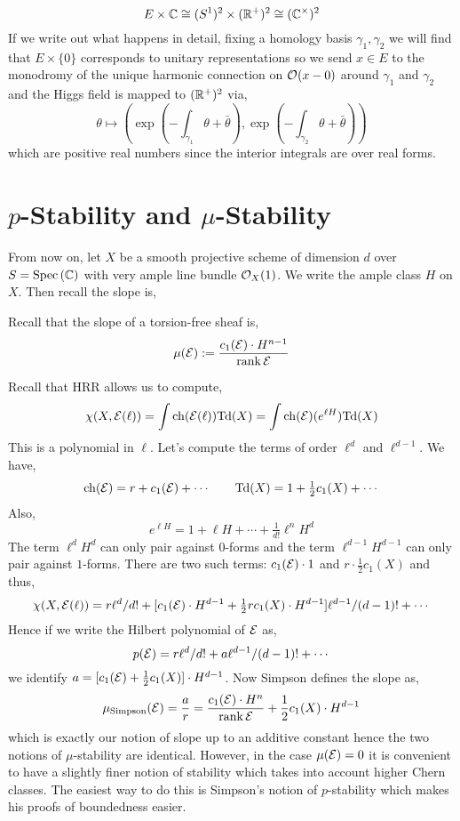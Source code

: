 \documentclass[12pt]{article}
\begin{document}
\[ E \times \mathbb{C} \cong (S^1)^2 \times (\mathbb{R}^+)^2 \cong (\mathbb{C}^\times)^2 \]
If we write out what happens in detail, fixing a homology basis $\gamma_1, \gamma_2$ we will find that $E \times \{ 0 \}$ corresponds to unitary representations so we send $x \in E$ to the monodromy of the unique harmonic connection on $\mathcal{O}_{}(x - 0)$ around $\gamma_1$ and $\gamma_2$ and the Higgs field is mapped to $(\mathbb{R}^+)^2$ via,
\[ \theta \mapsto \left( \exp\left( - \int_{\gamma_1} \theta + \bar{\theta} \right), \exp\left( - \int_{\gamma_2} \theta + \bar{\theta} \right) \right) \] 
which are positive real numbers since the interior integrals are over real forms.

\section{$p$-Stability and $\mu$-Stability}

From now on, let $X$ be a smooth projective scheme of dimension $d$ over $S = \mathrm{Spec}\left( \mathbb{C} \right)$ with very ample line bundle $\mathcal{O}_{X}(1)$. We write the ample class $H$ on $X$. Then recall the slope is,

\begin{defn}
Recall that the slope of a torsion-free sheaf is,
\[ \mu(\mathcal{E}) := \frac{c_1(\mathcal{E}) \cdot H^{n-1}}{\operatorname{\mathrm{rank}}{\mathcal{E}}} \]
\end{defn}

\newcommand{\Td}{\mathrm{Td}}
\renewcommand{\ch}{\mathrm{ch}}

\begin{rmk}
Recall that HRR allows us to compute,
\[ \chi(X, \E(\ell)) = \int \ch(\E(\ell)) \Td(X) = \int \ch(\E) (e^{\ell H}) \Td(X) \]
This is a polynomial in $\ell$. Let's compute the terms of order $\ell^d$ and $\ell^{d-1}$. We have,
\[ \ch(\E) = r + c_1(\E) + \cdots \quad \quad \Td(X) = 1 + \tfrac{1}{2} c_1(X) + \cdots \]
Also,
\[ e^{\ell H} = 1 + \ell H + \cdots + \tfrac{1}{d!} \ell^n H^d \]
The term $\ell^d H^d$ can only pair against $0$-forms and the term $\ell^{d-1} H^{d-1}$ can only pair against $1$-forms. There are two such terms: $c_1(\mathcal{E}) \cdot 1$ and $r \cdot \tfrac{1}{2} c_1(X)$ and thus,
\[ \chi(X, \mathcal{E}(\ell)) = r \ell^d/d! + [c_1(\mathcal{E})\cdot H^{d-1} + \tfrac{1}{2} r c_1(X) \cdot H^{d-1}] \ell^{d-1}/(d-1)! + \cdots \]
Hence if we write the Hilbert polynomial of $\mathcal{E}$ as,
\[ p(\mathcal{E}) = r \ell^d / d! + a \ell^{d-1} / (d-1)! + \cdots \]
we identify $a = [c_1(\mathcal{E}) + \tfrac{1}{2} c_1(X)] \cdot H^{d-1}$. Now Simpson defines the slope as,
\[ \mu_{\text{Simpson}}(\mathcal{E}) = \frac{a}{r} = \frac{c_1(\mathcal{E}) \cdot H^n}{\operatorname{\mathrm{rank}}{\mathcal{E}}} + \frac{1}{2} c_1(X) \cdot H^{d-1} \]
which is exactly our notion of slope up to an additive constant hence the two notions of $\mu$-stability are identical. However, in the case $\mu(\mathcal{E}) = 0$ it is convenient to have a slightly finer notion of stability which takes into account higher Chern classes. The easiest way to do this is Simpson's notion of $p$-stability which makes his proofs of boundedness easier.
\end{rmk}
\end{document}
